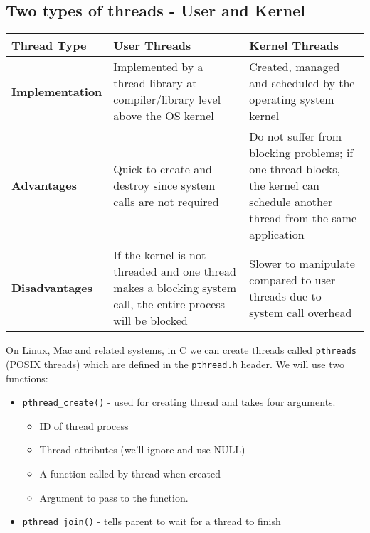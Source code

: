 \documentclass[a4paper, 10pt]{article}
\begin{document}
\subsection{Two types of threads - User and Kernel}
\begin{center}
    \begin{tabular}{|p{}|p{}|p{}|}
        \hline
        \textbf{Thread Type}    & \textbf{User Threads}                                                                                         & \textbf{Kernel Threads}                                                                                                      \\
        \hline
        \textbf{Implementation} & Implemented by a thread library at compiler/library level above the OS kernel                                 & Created, managed and scheduled by the operating system kernel                                                                \\
        \hline
        \textbf{Advantages}     & Quick to create and destroy since system calls are not required                                               & Do not suffer from blocking problems; if one thread blocks, the kernel can schedule another thread from the same application \\
        \hline
        \textbf{Disadvantages}  & If the kernel is not threaded and one thread makes a blocking system call, the entire process will be blocked & Slower to manipulate compared to user threads due to system call overhead                                                    \\
        \hline
    \end{tabular}
\end{center}
On Linux, Mac and related systems, in C we can create threads called \texttt{pthreads} (POSIX threads) which are defined in the \texttt{pthread.h} header. We will use two functions:
\begin{itemize}
    \item \texttt{pthread\_create()} - used for creating thread and takes four arguments.
          \begin{itemize}
              \item ID of thread process
              \item Thread attributes (we'll ignore and use NULL)
              \item A function called by thread when created
              \item Argument to pass to the function.
          \end{itemize}
    \item \texttt{pthread\_join()} - tells parent to wait for a thread to finish
\end{itemize}
\end{document}
